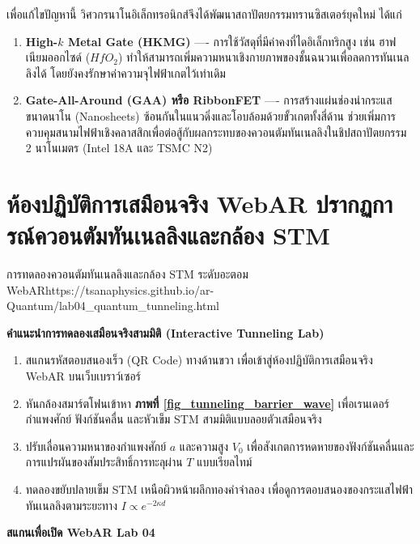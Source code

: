 เพื่อแก้ไขปัญหานี้ วิศวกรนาโนอิเล็กทรอนิกส์จึงได้พัฒนาสถาปัตยกรรมทรานซิสเตอร์ยุคใหม่ ได้แก่
\begin{enumerate}
    \item \textbf{High-$k$ Metal Gate (HKMG)} ---- การใช้วัสดุที่มีค่าคงที่ไดอิเล็กทริกสูง เช่น ฮาฟเนียมออกไซด์ ($HfO_2$) ทำให้สามารถเพิ่มความหนาเชิงกายภาพของชั้นฉนวนเพื่อลดการทันเนลลิงได้ โดยยังคงรักษาค่าความจุไฟฟ้าเกตไว้เท่าเดิม
    \item \textbf{Gate-All-Around (GAA) หรือ RibbonFET} ---- การสร้างแผ่นช่องนำกระแสขนาดนาโน (Nanosheets) ซ้อนกันในแนวดิ่งและโอบล้อมด้วยขั้วเกตทั้งสี่ด้าน ช่วยเพิ่มการควบคุมสนามไฟฟ้าเชิงคลาสสิกเพื่อต่อสู้กับผลกระทบของควอนตัมทันเนลลิงในชิปสถาปัตยกรรม 2 นาโนเมตร (Intel 18A และ TSMC N2)
\end{enumerate}

\section{ห้องปฏิบัติการเสมือนจริง WebAR ปรากฏการณ์ควอนตัมทันเนลลิงและกล้อง STM}
\label{sec_webar_lab04}

\begin{qrcodelabbox}{การทดลองควอนตัมทันเนลลิงและกล้อง STM ระดับอะตอม WebAR}{https://tsanaphysics.github.io/ar-Quantum/lab04_quantum_tunneling.html}
\begin{minipage}[c]{0.70\textwidth}
\textbf{คำแนะนำการทดลองเสมือนจริงสามมิติ (Interactive Tunneling Lab)}
\begin{enumerate}
    \item สแกนรหัสตอบสนองเร็ว (QR Code) ทางด้านขวา เพื่อเข้าสู่ห้องปฏิบัติการเสมือนจริง WebAR บนเว็บเบราว์เซอร์
    \item หันกล้องสมาร์ตโฟนเข้าหา \textbf{ภาพที่ \ref{fig_tunneling_barrier_wave}} เพื่อเรนเดอร์กำแพงศักย์ ฟังก์ชันคลื่น และหัวเข็ม STM สามมิติแบบลอยตัวเสมือนจริง
    \item ปรับเลื่อนความหนาของกำแพงศักย์ $a$ และความสูง $V_0$ เพื่อสังเกตการหดหายของฟังก์ชันคลื่นและการแปรผันของสัมประสิทธิ์การทะลุผ่าน $T$ แบบเรียลไทม์
    \item ทดลองขยับปลายเข็ม STM เหนือผิวหน้าผลึกทองคำจำลอง เพื่อดูการตอบสนองของกระแสไฟฟ้าทันเนลลิงตามระยะทาง $I \propto e^{-2\kappa d}$
\end{enumerate}
\end{minipage}
\hfill
\begin{minipage}[c]{0.25\textwidth}
\centering
{}
\vspace{4pt}
\scriptsize\textbf{สแกนเพื่อเปิด WebAR Lab 04}
\end{minipage}
\end{qrcodelabbox}

